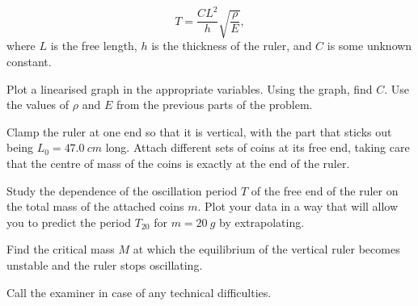 \documentclass[../TST.tex]{subfiles}
\begin{document}
\begin{eproblem}{\ \\[5pt]}
\begin{equation*}
	T=\frac{CL^2}{h}\sqrt{\frac{\rho}{E}},
\end{equation*}
where $L$ is the free length, $h$ is the thickness of the ruler, and $C$ is some unknown constant.
\begin{subpart}[resume]
	\item Plot a linearised graph in the appropriate variables. Using the graph, find $C$. Use the values of $\rho$ and $E$ from the previous parts of the problem. 
\end{subpart}
Clamp the ruler at one end so that it is vertical, with the part that sticks out being $L_0=\qty{47.0}{cm}$ long.  Attach different sets of coins at its free end, taking care that the centre of mass of the coins is exactly at the end of the ruler. 
\begin{subpart}[resume]
	\item Study the dependence of the oscillation period $T$ of the free end of the ruler on the total mass of the attached coins $m$. Plot your data in a way that will allow you to predict the period $T_{20}$ for $m=\qty{20}{g}$ by extrapolating. 
	\item Find the critical mass $M$ at which the equilibrium of the vertical ruler becomes unstable and the ruler stops oscillating. 
\end{subpart}
Call the examiner in case of any technical difficulties.\\
\end{eproblem}
\vspace{3ex}
\end{document}
